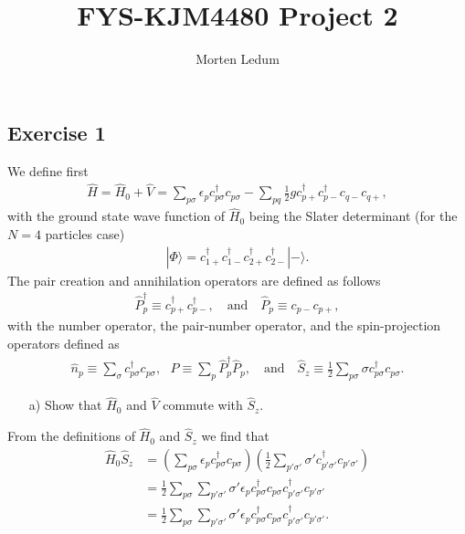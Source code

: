 \documentclass[a4paper]{article}
\title{FYS-KJM4480 Project 2}
\date{}
\author{Morten Ledum}
\newcommand{\nn}{\nonumber}
\newcommand{\ps}{{p\sigma}}
\newcommand{\cpp}{c_{p+}}
\newcommand{\cpm}{c_{p-}}
\newcommand{\cqp}{c_{q+}}
\newcommand{\cqm}{c_{q-}}
\begin{document}
\maketitle
\subsection*{Exercise 1}

\begin{exframe}
We define first 
\begin{align}
\hat H = \hat H_0 + \hat V = \sum_{p\sigma} \epsilon_p c_\ps^\dagger c_\ps - \sum_{pq}\frac{1}{2}g \cpp^\dagger \cpm^\dagger \cqm \cqp,
\end{align}
with the ground state wave function of $\hat H_0$ being the Slater determinant (for the $N=4$ particles case) 
\begin{align}
|\Phi\rangle = c_{1+}^\dagger c_{1-}^\dagger c_{2+}^\dagger c_{2-}^\dagger |-\rangle.
\end{align}
The pair creation and annihilation operators are defined as follows
\begin{align}
\hat P^\dagger_p \equiv \cpp^\dagger \cpm^\dagger, \ \ \ \text{ and } \ \ \ \hat P_p \equiv \cpm \cpp,
\end{align}
with the number operator, the pair-number operator, and the spin-projection operators defined as
\begin{align}
\hat n_p \equiv \sum_\sigma c_\ps^\dagger c_\ps, \ \ \ \hat P \equiv \sum_p \hat P^\dagger_p \hat P_p, \ \ \ \text{ and } \ \ \ \hat S_z \equiv \frac{1}{2}\sum_\ps \sigma c_\ps^\dagger c_\ps.
\end{align}
\begin{itemize}
  \item[a)] Show that $\hat H_0$ and $\hat V$ commute with $\hat S_z$.
\end{itemize}
\end{exframe}
From the definitions of $\hat H_0$ and $\hat S_z$ we find that
\begin{align}
\hat H_0 \hat S_z &= \left(  \sum_\ps \epsilon_p c_\ps^\dagger c_\ps \right) \left(   \frac{1}{2}\sum_{p'\sigma'} \sigma' c_{p'\sigma'}^\dagger c_{p'\sigma'}  \right) \nn\\
%
&= \frac{1}{2}\sum_\ps \sum_{p'\sigma'}\sigma'  \epsilon_p c_\ps^\dagger c_\ps  c_{p'\sigma'}^\dagger c_{p'\sigma'} \nn\\
%
&= \frac{1}{2}\sum_\ps \sum_{p'\sigma'}\sigma'  \epsilon_p c_\ps^\dagger c_\ps  c_{p'\sigma'}^\dagger c_{p'\sigma'}.
\end{align}
\end{document}
